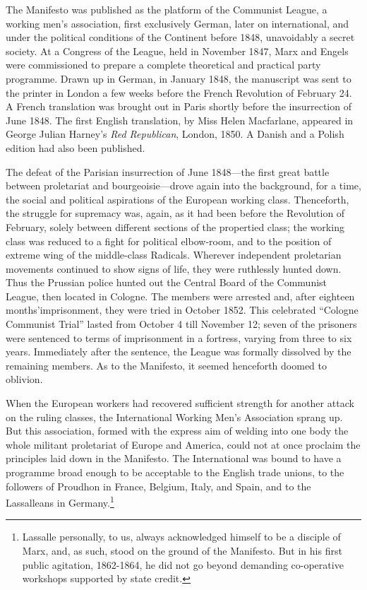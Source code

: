 The Manifesto was published as the platform of the Communist League, a working men's association, first exclusively German, later on international, and under the political conditions of the Continent before 1848, unavoidably a secret society. At a Congress of the League, held in November 1847, Marx and Engels were commissioned to prepare a complete theoretical and practical party programme. Drawn up in German, in January 1848, the manuscript was sent to the printer in London a few weeks before the French Revolution of February 24. A French translation was brought out in Paris shortly before the insurrection of June 1848. The first English translation, by Miss Helen Macfarlane, appeared in George Julian Harney's \emph{Red Republican}, London, 1850. A Danish and a Polish edition had also been published. 

The defeat of the Parisian insurrection of June 1848---the first great battle between proletariat and bourgeoisie---drove again into the background, for a time, the social and political aspirations of the European working class. Thenceforth, the struggle for supremacy was, again, as it had been before the Revolution of February, solely between different sections of the propertied class; the working class was reduced to a fight for political elbow-room, and to the position of extreme wing of the middle-class Radicals. Wherever independent proletarian movements continued to show signs of life, they were ruthlessly hunted down. Thus the Prussian police hunted out the Central Board of the Communist League, then located in Cologne. The members were arrested and, after eighteen months'imprisonment, they were tried in October 1852. This celebrated ``Cologne Communist Trial'' lasted from October 4 till November 12; seven of the prisoners were sentenced to terms of imprisonment in a fortress, varying from three to six years. Immediately after the sentence, the League was formally dissolved by the remaining members. As to the Manifesto, it seemed henceforth doomed to oblivion. 

When the European workers had recovered sufficient strength for another attack on the ruling classes, the International Working Men's Association sprang up. But this association, formed with the express aim of welding into one body the whole militant proletariat of Europe and America, could not at once proclaim the principles laid down in the Manifesto. The International was bound to have a programme broad enough to be acceptable to the English trade unions, to the followers of Proudhon in France, Belgium, Italy, and Spain, and to the Lassalleans in Germany.\footnote{Lassalle personally, to us, always acknowledged himself to be a disciple of Marx, and, as such, stood on the ground of the Manifesto. But in his first public agitation, 1862-1864, he did not go beyond demanding co-operative workshops supported by state credit. }


